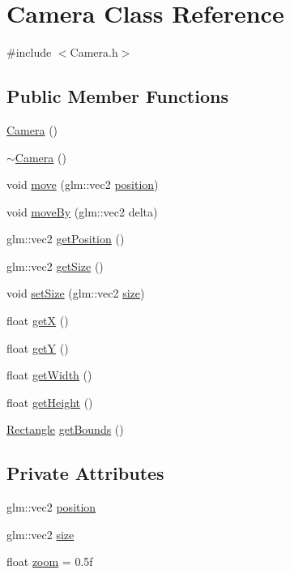 \hypertarget{class_camera}{}\section{Camera Class Reference}
\label{class_camera}


{\ttfamily \#include $<$Camera.\+h$>$}

\subsection*{Public Member Functions}
\begin{DoxyCompactItemize}
\item 
\hyperlink{class_camera_a01f94c3543f56ede7af49dc778f19331}{Camera} ()
\item 
\hyperlink{class_camera_ad1897942d0ccf91052386388a497349f}{$\sim$\+Camera} ()
\item 
void \hyperlink{class_camera_a3a9f789d49dc49569f0455157f5aa3b9}{move} (glm\+::vec2 \hyperlink{class_camera_ab1427fe342c2a550b5eea064311cc473}{position})
\item 
void \hyperlink{class_camera_abfa25e9a9791ab285b1c619c40c5bea7}{move\+By} (glm\+::vec2 delta)
\item 
glm\+::vec2 \hyperlink{class_camera_a6628404766f5ca99066d58e119720c6c}{get\+Position} ()
\item 
glm\+::vec2 \hyperlink{class_camera_ac495b981e1eea213d429e49bb59a5f6b}{get\+Size} ()
\item 
void \hyperlink{class_camera_af755aa66130cb97058a7b0a9558ea06a}{set\+Size} (glm\+::vec2 \hyperlink{class_camera_a54d49644a8999ae4cb1c9f824091c4d1}{size})
\item 
float \hyperlink{class_camera_ae7c46d026313f6faefdcfdb5094ea8cb}{getX} ()
\item 
float \hyperlink{class_camera_ad71d83315248602503546eba37697390}{getY} ()
\item 
float \hyperlink{class_camera_a17a09a5d85ed62c92c3c17969e4b2df3}{get\+Width} ()
\item 
float \hyperlink{class_camera_a6aa244c08427100da9e8ea5b2fa88cd8}{get\+Height} ()
\item 
\hyperlink{class_rectangle}{Rectangle} \hyperlink{class_camera_af17699acfd4d8fecc450a64e619f95d5}{get\+Bounds} ()
\end{DoxyCompactItemize}
\subsection*{Private Attributes}
\begin{DoxyCompactItemize}
\item 
glm\+::vec2 \hyperlink{class_camera_ab1427fe342c2a550b5eea064311cc473}{position}
\item 
glm\+::vec2 \hyperlink{class_camera_a54d49644a8999ae4cb1c9f824091c4d1}{size}
\item 
float \hyperlink{class_camera_a21fc9e142b104d8e94126657abaa075f}{zoom} = 0.\+5f
\end{DoxyCompactItemize}


